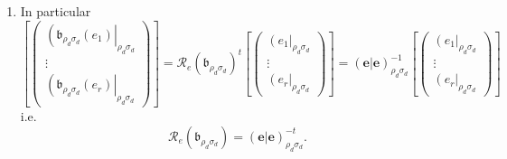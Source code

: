 \documentclass[aps,preprint]{revtex4}
\begin{document}
\begin{enumerate}
\begin{enumerate}
\item In particular 
\begin{equation}
\left[ \left( 
\begin{array}{c}
\left( \mathfrak{b}_{\rho _{d}\sigma _{d}}\left( e_{1}\right) \right\vert
_{\rho _{d}\sigma _{d}} \\ 
\vdots \\ 
\left( \mathfrak{b}_{\rho _{d}\sigma _{d}}\left( e_{r}\right) \right\vert
_{\rho _{d}\sigma _{d}}%
\end{array}%
\right) \right] =\mathcal{R}_{e}\left( \mathfrak{b}_{\rho _{d}\sigma
_{d}}\right) ^{t}\left[ \left( 
\begin{array}{c}
\left( e_{1}\right\vert _{\rho _{d}\sigma _{d}} \\ 
\vdots \\ 
\left( e_{r}\right\vert _{\rho _{d}\sigma _{d}}%
\end{array}%
\right) \right] =\left( \left. \overset{}{\boldsymbol{e}}\right\vert 
\boldsymbol{e}\right) _{\rho _{d}\sigma _{d}}^{-1}\left[ \left( 
\begin{array}{c}
\left( e_{1}\right\vert _{\rho _{d}\sigma _{d}} \\ 
\vdots \\ 
\left( e_{r}\right\vert _{\rho _{d}\sigma _{d}}%
\end{array}%
\right) \right]
\end{equation}%
i.e. 
\begin{equation}
\mathcal{R}_{e}\left( \mathfrak{b}_{\rho _{d}\sigma _{d}}\right) =\left(
\left. \overset{}{\boldsymbol{e}}\right\vert \boldsymbol{e}\right) _{\rho
_{d}\sigma _{d}}^{-t}.
\end{equation}


\end{enumerate}
\end{enumerate}
\end{document}
